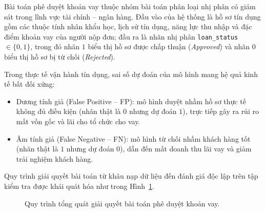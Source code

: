 \documentclass[12pt,a4paper,oneside]{report}
\begin{document}
Bài toán phê duyệt khoản vay thuộc nhóm bài toán phân loại nhị phân có giám sát trong lĩnh vực tài chính -- ngân hàng. Đầu vào của hệ thống là hồ sơ tín dụng gồm các thuộc tính nhân khẩu học, lịch sử tín dụng, năng lực thu nhập và đặc điểm khoản vay của người nộp đơn; đầu ra là nhãn nhị phân \texttt{loan\_status} $\in \{0, 1\}$, trong đó nhãn $1$ biểu thị hồ sơ được chấp thuận (\textit{Approved}) và nhãn $0$ biểu thị hồ sơ bị từ chối (\textit{Rejected}).

Trong thực tế vận hành tín dụng, sai số dự đoán của mô hình mang hệ quả kinh tế bất đối xứng:
\begin{itemize}
  \item Dương tính giả (False Positive -- FP): mô hình duyệt nhầm hồ sơ thực tế không đủ điều kiện (nhãn thật là $0$ nhưng dự đoán $1$), trực tiếp gây ra rủi ro mất vốn gốc và lãi cho tổ chức cho vay.
  \item Âm tính giả (False Negative -- FN): mô hình từ chối nhầm khách hàng tốt (nhãn thật là $1$ nhưng dự đoán $0$), dẫn đến mất doanh thu lãi vay và giảm trải nghiệm khách hàng.
\end{itemize}

Quy trình giải quyết bài toán từ khâu nạp dữ liệu đến đánh giá độc lập trên tập kiểm tra được khái quát hóa như trong Hình~\ref{fig:quytrinh}.

\begin{figure}[H]
  \centering
  \caption{Quy trình tổng quát giải quyết bài toán phê duyệt khoản vay.}
  \label{fig:quytrinh}
\end{figure}
\end{document}
